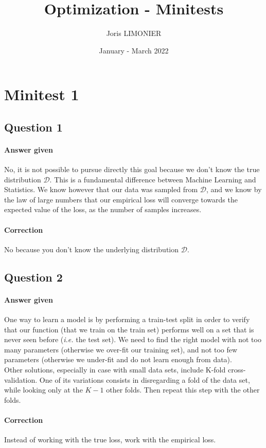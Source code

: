 \documentclass{article}
\title{Optimization - Minitests}
\author{Joris LIMONIER}
\date{January - March 2022}
\newcommand{\1}{\mathbf{1}}
\newcommand{\ie}{\textit{i.e. }}
\begin{document}
\maketitle
\tableofcontents

\section{Minitest 1}
\subsection{Question 1}
\paragraph{Answer given}
No, it is not possible to pursue directly this goal because we don't know the true distribution \(\mathcal{D}\). This is a fundamental difference between Machine Learning and Statistics. We know however that our data was sampled from \(\mathcal{D}\), and we know by the law of large numbers that our empirical loss will converge towards the expected value of the loss, as the number of samples increases.
\paragraph{Correction} No because you don't know the underlying distribution \(\mathcal{D}\).

\subsection{Question 2}
\paragraph{Answer given}
One way to learn a model is by performing a train-test split in order to verify that our function (that we train on the train set) performs well on a set that is never seen before (\ie the test set). We need to find the right model with not too many parameters (otherwise we over-fit our training set), and not too few parameters (otherwise we under-fit and do not learn enough from data). \\
Other solutions, especially in case with small data sets, include K-fold cross-validation. One of its variations consists in disregarding a fold of the data set, while looking only at the \(K-1\) other folds. Then repeat this step with the other folds.
\paragraph{Correction} Instead of working with the true loss, work with the empirical loss.
\end{document}
